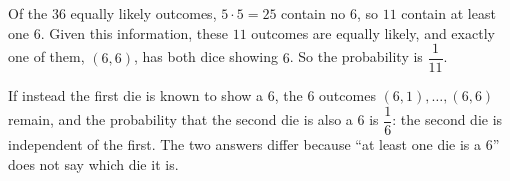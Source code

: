 Of the $36$ equally likely outcomes, $5\cdot5=25$ contain no $6$, so $11$ contain at least one $6$. Given this information, these $11$ outcomes are equally likely, and exactly one of them, $(6,6)$, has both dice showing $6$. So the probability is $\boxed{\dfrac{1}{11}}$.

If instead the first die is known to show a $6$, the $6$ outcomes $(6,1),\dots,(6,6)$ remain, and the probability that the second die is also a $6$ is $\boxed{\dfrac16}$: the second die is independent of the first. The two answers differ because ``at least one die is a $6$'' does not say which die it is.
